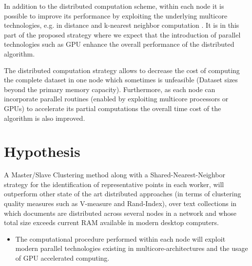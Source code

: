 \documentclass[10pt]{article}
\begin{document}
In addition to the distributed computation scheme, within each node it is possible to improve its performance by exploiting the underlying multicore technologies, e.g. in distance and k-nearest neighbor computation \citep{GMNAG15}. 
It is in this part of the proposed strategy where we expect that the introduction of parallel technologies such as GPU enhance the overall performance of the distributed algorithm.

The distributed computation strategy allows to decrease the cost of computing the complete dataset in one node which sometimes is unfeasible (Dataset sizes beyond the primary memory capacity). Furthermore, as each node can incorporate parallel routines (enabled by exploiting multicore processors or GPUs) to accelerate its partial computations the overall time cost of the algorithm is also improved.

\section{Hypothesis}


A Master/Slave Clustering method along with a Shared-Nearest-Neighbor strategy for the identification of representative points in each worker, will outperform other state of the art distributed approaches (in terms of clustering quality measures such as V-measure and Rand-Index), over text collections in which documents are distributed across several nodes in a network and whose total size exceeds current RAM available in modern desktop computers.
\begin{itemize}
\item The computational procedure performed within each node will exploit modern parallel technologies existing in multicore-architectures and the usage of GPU accelerated computing.
\end{itemize}
\end{document}
